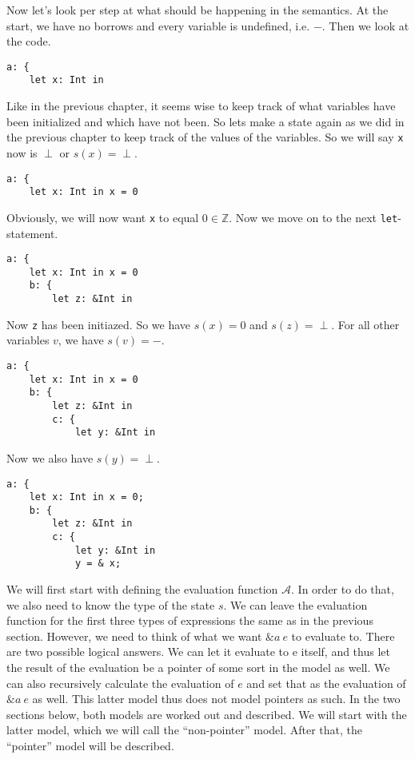 Now let's look per step at what should be happening in the semantics. At the start, we have no borrows and every variable is undefined, i.e. $-$. Then we look at the code. 

\begin{verbatim}
a: {
    let x: Int in 
\end{verbatim}

Like in the previous chapter, it seems wise to keep track of what variables have been initialized and which have not been. So lets make a state again as we did in the previous chapter to keep track of the values of the variables. So we will say \texttt{x} now is $\perp$ or $s(x) = \perp$.  

\begin{verbatim}
a: {
    let x: Int in x = 0
\end{verbatim}

Obviously, we will now want \verb|x| to equal $0 \in \mathbb{Z}$. Now we move on to the next \verb|let|-statement.

\begin{verbatim}
a: {
    let x: Int in x = 0
    b: {
        let z: &Int in
\end{verbatim}

Now \verb|z| has been initiazed. So we have $s(x) = 0$ and $s(z) = \perp$. For all other variables $v$, we have $s(v) = -$. 

\begin{verbatim}
a: {
    let x: Int in x = 0
    b: {
        let z: &Int in 
        c: {
            let y: &Int in
\end{verbatim}

Now we also have $s(y) = \perp$.

\begin{verbatim}
a: {
    let x: Int in x = 0;
    b: {
        let z: &Int in 
        c: {
            let y: &Int in
            y = & x;
\end{verbatim}





We will first start with defining the evaluation function $\mathcal{A}$. In order to do that, we also need to know the type of the state $s$. We can leave the evaluation function for the first three types of expressions the same as in the previous section. However, we need to think of what we want $\&a~e$ to evaluate to. There are two possible logical answers. We can let it evaluate to e itself, and thus let the result of the evaluation be a pointer of some sort in the model as well. We can also recursively calculate the evaluation of $e$ and set that as the evaluation of $\&a~e$ as well. This latter model thus does not model pointers as such. In the two sections below, both models are worked out and described. We will start with the latter model, which we will call the ``non-pointer'' model. After that, the ``pointer'' model will be described. 


